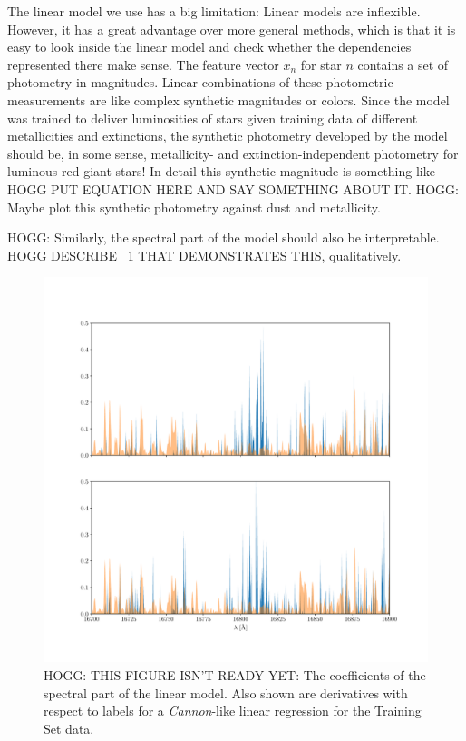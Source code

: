 \documentclass[modern]{aastex62}
\newcommand{\project}[1]{\textsl{#1}}
\begin{document}
The linear model we use has a big limitation: Linear models are inflexible.
However, it has a great advantage over more general methods,
which is that it is easy to look inside
the linear model and check whether the dependencies represented there make sense.
The feature vector $x_n$ for star $n$
contains a set of photometry in magnitudes.
Linear combinations of these photometric measurements are like complex synthetic
magnitudes or colors.
Since the model was trained to deliver luminosities of stars given training data
of different metallicities and extinctions, the synthetic photometry developed
by the model should be, in some sense, metallicity- and extinction-independent
photometry for luminous red-giant stars!
In detail this synthetic magnitude is something like HOGG PUT EQUATION HERE AND
SAY SOMETHING ABOUT IT. HOGG: Maybe plot this synthetic photometry against dust
and metallicity.

HOGG: Similarly, the spectral part of the model should also be
interpretable. HOGG DESCRIBE \figurename~\ref{fig:spectral} THAT
DEMONSTRATES THIS, qualitatively.
\begin{figure}
\includegraphics[width=\textwidth]{coefficients.pdf}
\caption{HOGG: THIS FIGURE ISN'T READY YET:
  The coefficients of the spectral part of the linear model.
  Also shown are derivatives with respect to labels for a \project{Cannon}-like
  linear regression for the Training Set data.\label{fig:spectral}}
\end{figure}
\end{document}
